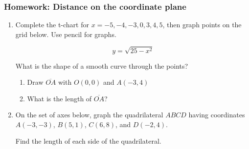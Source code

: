 \documentclass[12pt, twoside]{article}
\begin{document}
\subsubsection*{Homework: Distance on the coordinate plane}
  \begin{enumerate}

    \item Complete the t-chart for $x=-5,-4,-3,0,3,4,5$, then graph points on the grid below. Use pencil for graphs.

        \[y = \sqrt{25-x^2}\]

        What is the shape of a smooth curve through the points?
      \begin{center} %
      \end{center}

    \begin{enumerate}
      \item Draw $\overline{OA}$ with $O(0,0)$ and $A(-3,4)$
      \item What is the length of $\overline{OA}$? \vspace{1.5cm}
    \end{enumerate}



\newpage

  \item On the set of axes below, graph the quadrilateral $ABCD$ having coordinates $A(-3,-3)$, $B(5,1)$, $C(6,8)$, and $D(-2,4)$.
    \begin{center} %
    \end{center}
    Find the length of each side of the quadrilateral.



  \end{enumerate}

  
\end{document}
